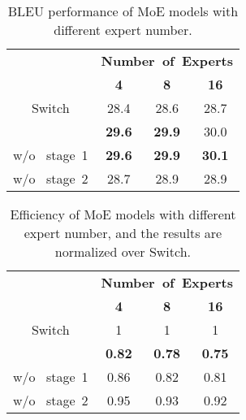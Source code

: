 \begin{table}[t]
    \caption{BLEU performance of MoE models with different expert number. }
        \begin{center}
            \begin{tabular}{c|ccc}
            \toprule 
            {} & \multicolumn{3}{c}{\textbf{Number\ of\ Experts }} \\
            &{\textbf{4}} & {\textbf{8}} &{\textbf{16}}\\ 
            \midrule
            {Switch}
            &{28.4} 
            &{28.6} &{28.7}\\
            {\ourmethods{}} 
            &\textbf{29.6} &\textbf{29.9}
            &{30.0} \\
            {\quad\quad\quad\quad w/o \ stage\ 1}  
            &\textbf{29.6} &\textbf{29.9}  
            &\textbf{30.1}  \\
            {\quad\quad\quad\quad w/o \ stage\ 2}  
            &{28.7} &{28.9}  
            &{28.9} \\
            \bottomrule
            \end{tabular}
        \end{center}
\label{tab:expert_number}
\end{table}

\begin{table}[t]
    \caption{Efficiency of MoE models with different expert number, and the results are normalized over Switch.}
        \begin{center}
            \begin{tabular}{c|ccc}
            \toprule 
            {} & \multicolumn{3}{c}{\textbf{Number\ of\ Experts }} \\
            &{\textbf{4}} & {\textbf{8}} &{\textbf{16}}\\ 
            \midrule
            {Switch}
            &{1} 
            &{1} &{1}\\
            {\ourmethods{}} 
            &\textbf{0.82}
            &\textbf{0.78} &\textbf{0.75} \\
            {\quad\quad\quad\quad w/o \ stage\ 1}  
            &{0.86}  
            &{0.82} &{0.81} \\
            {\quad\quad\quad\quad w/o \ stage\ 2}  
            &{0.95}  
            &{0.93} &{0.92} \\
            \bottomrule
            \end{tabular}
        \end{center}
\label{tab:efficiency}
\end{table}

